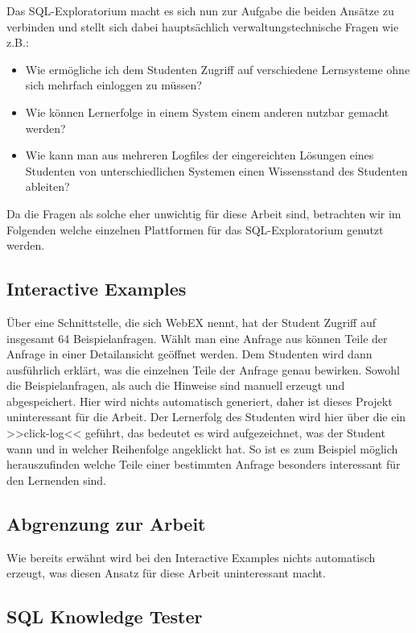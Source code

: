 Das SQL-Exploratorium macht es sich nun zur Aufgabe die beiden Ansätze zu verbinden und stellt sich dabei hauptsächlich verwaltungstechnische Fragen wie z.B.:

\begin{itemize}
\item Wie ermögliche ich dem Studenten Zugriff auf verschiedene Lernsysteme ohne sich mehrfach einloggen zu müssen?
\item Wie können Lernerfolge in einem System einem anderen nutzbar gemacht werden?
\item Wie kann man aus mehreren Logfiles der eingereichten Lösungen eines Studenten von unterschiedlichen Systemen einen Wissensstand des Studenten ableiten?
\end{itemize}

Da die Fragen als solche eher unwichtig für diese Arbeit sind, betrachten wir im Folgenden welche einzelnen Plattformen für das SQL-Exploratorium genutzt werden.

\subsection{Interactive Examples}

Über eine Schnittstelle, die sich WebEX nennt, hat der Student Zugriff auf insgesamt 64 Beispielanfragen. Wählt man eine Anfrage aus können Teile der Anfrage in einer Detailansicht geöffnet werden. Dem Studenten wird dann ausführlich erklärt, was die einzelnen Teile der Anfrage genau bewirken. Sowohl die Beispielanfragen, als auch die Hinweise sind manuell erzeugt und abgespeichert. Hier wird nichts automatisch generiert, daher ist dieses Projekt uninteressant für die Arbeit. Der Lernerfolg des Studenten wird hier über die ein >>click-log<< geführt, das bedeutet es wird aufgezeichnet, was der Student wann und in welcher Reihenfolge angeklickt hat. So ist es zum Beispiel möglich herauszufinden welche Teile einer bestimmten Anfrage besonders interessant für den Lernenden sind.

\subsection*{Abgrenzung zur Arbeit}

Wie bereits erwähnt wird bei den Interactive Examples nichts automatisch erzeugt, was diesen Ansatz für diese Arbeit uninteressant macht.

\subsection{SQL Knowledge Tester}

